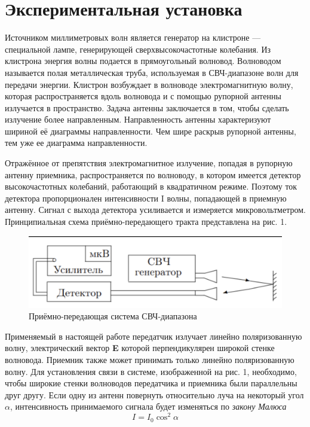 \documentclass[a4paper,12pt]{article}
\begin{document}
\section{Экспериментальная установка}
Источником миллиметровых волн является генератор на клистроне — специальной лампе, генерирующей сверхвысокочастотные колебания. Из клистрона энергия волны подается в прямоугольный волновод. Волноводом называется полая металлическая труба, используемая в СВЧ-диапазоне волн для передачи энергии. Клистрон возбуждает в волноводе
электромагнитную волну, которая распространяется вдоль волновода и с помощью рупорной антенны излучается в пространство. Задача антенны заключается в том, чтобы сделать излучение более направленным. Направленность антенны характеризуют шириной её диаграммы направленности. Чем шире раскрыв рупорной
антенны, тем уже ее диаграмма направленности. \par
Отражённое от препятствия электромагнитное излучение, попадая в рупорную антенну приемника, распространяется по волноводу, в котором имеется детектор высокочастотных колебаний,
работающий в квадратичном режиме. Поэтому ток детектора пропорционален интенсивности I волны, попадающей в приемную антенну. Сигнал с выхода детектора усиливается и измеряется микровольтметром. Принципиальная схема приёмно-передающего тракта представлена на рис. 1.

\begin{figure}[h]
    \centering
    \includegraphics[width=12cm]{pic 1.PNG}
    \caption{Приёмно-передающая система СВЧ-диапазона}
    \label{fig:vac}
\end{figure}

Применяемый в настоящей работе передатчик излучает линейно поляризованную волну, электрический вектор \textbf{E} которой перпендикулярен широкой стенке волновода. Приемник также может принимать только линейно поляризованную волну. Для установления связи в системе, изображенной на рис. 1, необходимо, чтобы широкие стенки волноводов передатчика и приемника были параллельны друг другу.
Если одну из антенн повернуть относительно луча на некоторый угол $\alpha$, интенсивность принимаемого сигнала будет изменяться по \textit{закону Малюса}
\begin{equation}
    I = I_0 \cos^2 \alpha
\end{equation}
\end{document}
